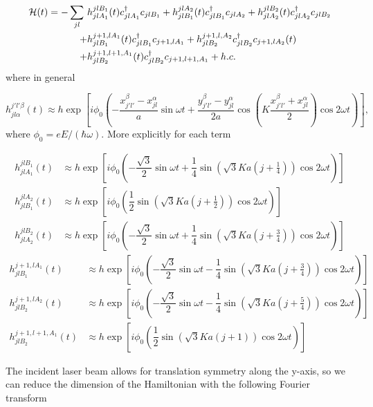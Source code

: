 \begin{equation}
\begin{split}
  \mathcal{H} (t) = -\sum_{jl} \ &h_{jlA_1}^{jlB_1}(t) c^{\dagger}_{jlA_1} c_{jlB_1} + h_{jlB_1}^{jlA_2}(t) c^{\dagger}_{jlB_1} c_{jlA_2} + h_{jlA_2}^{jlB_2}(t) c^{\dagger}_{jlA_2} c_{jlB_2} \\
      + &h_{jlB_1}^{j+1,lA_1}(t) c^{\dagger}_{jlB_1} c_{j+1,lA_1} + h_{jlB_2}^{j+1,l,A_2} c^{\dagger}_{jlB_2} c_{j+1,lA_2}(t) \\
      + &h_{jlB_2}^{j+1,l+1,A_1}(t) c^{\dagger}_{jlB_2} c_{j+1,l+1,A_1} + h.c.
\end{split}
\end{equation}
where in general

\begin{equation}
  h_{jl\alpha}^{j'l'\beta} (t) \approx h \exp \left[ i \phi_0 \left(-\dfrac{x_{j'l'}^{\beta} - x_{jl}^{\alpha}}{a} \sin\omega t + \dfrac{y_{j'l'}^{\beta} - y_{jl}^{\alpha}}{2a} \cos\left(K \dfrac{x_{j'l'}^{\beta} + x_{jl}^{\alpha}}{2}\right) \cos 2\omega t \right) \right],
\end{equation}
where $\phi_{0} = eE/(\hbar \omega)$.
More explicitly for each term

\begin{align}
  h_{jlA_1}^{jlB_1}(t) &\approx h \exp \left[ i\phi_0 \left(-\dfrac{\sqrt{3}}{2} \sin\omega t + \dfrac{1}{4} \sin(\sqrt{3}Ka(j+\tfrac{1}{4})) \cos 2\omega t \right) \right] \\
  h_{jlB_1}^{jlA_2}(t) &\approx h \exp \left[ i\phi_0 \left(\dfrac{1}{2} \sin(\sqrt{3}Ka(j+\tfrac{1}{2})) \cos 2\omega t \right) \right] \\
  h_{jlA_2}^{jlB_2}(t) &\approx h \exp \left[ i\phi_0 \left(-\dfrac{\sqrt{3}}{2} \sin\omega t + \dfrac{1}{4} \sin(\sqrt{3}Ka(j+\tfrac{3}{4})) \cos 2\omega t \right) \right]
\end{align}
\begin{align}
  h_{jlB_1}^{j+1,lA_1}(t) &\approx h \exp \left[ i\phi_0 \left(-\dfrac{\sqrt{3}}{2} \sin\omega t - \dfrac{1}{4} \sin(\sqrt{3}Ka(j+\tfrac{3}{4})) \cos 2\omega t \right) \right] \\
  h_{jlB_2}^{j+1,lA_2}(t) &\approx h \exp \left[ i\phi_0 \left(-\dfrac{\sqrt{3}}{2}\sin\omega t -\dfrac{1}{4} \sin(\sqrt{3}Ka(j+\tfrac{5}{4})) \cos 2\omega t \right) \right] \\
  h_{jlB_2}^{j+1,l+1,A_1}(t) &\approx h \exp \left[ i\phi_0 \left(\dfrac{1}{2} \sin(\sqrt{3}Ka(j+1)) \cos 2\omega t \right) \right]
\end{align}

The incident laser beam allows for translation symmetry along the y-axis, so we can reduce the dimension of the Hamiltonian with the following Fourier transform

